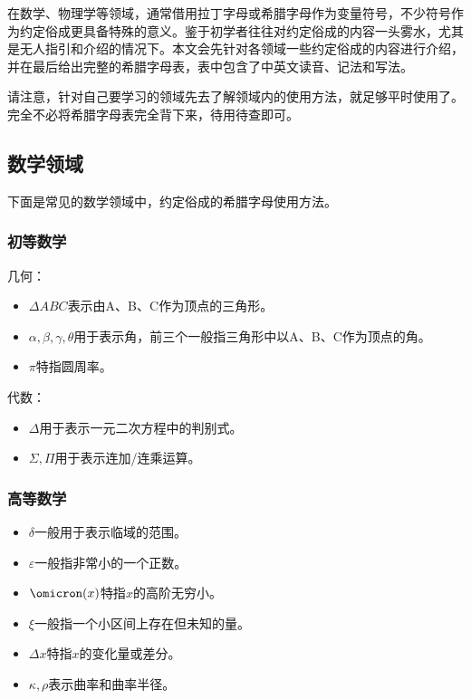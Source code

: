 \begin{issues}
\issueDraft
\end{issues}

在数学、物理学等领域，通常借用拉丁字母或希腊字母作为变量符号，不少符号作为约定俗成更具备特殊的意义。鉴于初学者往往对约定俗成的内容一头雾水，尤其是无人指引和介绍的情况下。本文会先针对各领域一些约定俗成的内容进行介绍，并在最后给出完整的希腊字母表，表中包含了中英文读音、记法和写法。

请注意，针对自己要学习的领域先去了解领域内的使用方法，就足够平时使用了。完全不必将希腊字母表完全背下来，待用待查即可。

\subsection{数学领域}

下面是常见的数学领域中，约定俗成的希腊字母使用方法。

\subsubsection{初等数学}

几何：

\begin{itemize}
\item $\Delta ABC$表示由A、B、C作为顶点的三角形。
\item $\alpha,\beta,\gamma,\theta$用于表示角，前三个一般指三角形中以A、B、C作为顶点的角。
\item $\pi$特指圆周率。
\end{itemize}

代数：

\begin{itemize}
\item $\Delta$用于表示一元二次方程中的判别式。
\item $\Sigma,\Pi$用于表示连加/连乘运算。
\end{itemize}

\subsubsection{高等数学}

\begin{itemize}
\item $\delta$一般用于表示临域的范围。
\item $\varepsilon$一般指非常小的一个正数。
\item $\omicron (x)$特指$x$的高阶无穷小。
\item $\xi$一般指一个小区间上存在但未知的量。
\item $\Delta x$特指$x$的变化量或差分。
\item $\kappa,\rho$表示曲率和曲率半径。
\end{itemize}

